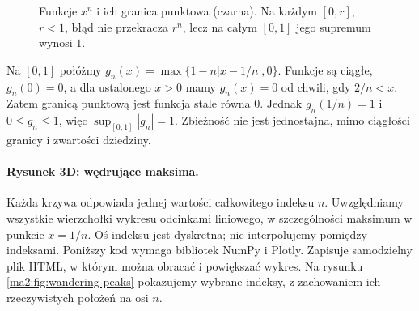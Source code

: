 \begin{figure}[htbp]
\centering
{}
\caption{Funkcje $x^n$ i ich granica punktowa (czarna).
Na każdym $[0,r]$, $r<1$, błąd nie przekracza $r^n$,
lecz na całym $[0,1]$ jego supremum wynosi $1$.}
\label{ma2:fig:powers-uniform}
\end{figure}
\FloatBarrier

\begin{przyklad}
\label{ma2:ex:moving-peak}
Na $[0,1]$ połóżmy
$g_n(x)=\max\{1-n|x-1/n|,0\}$.
Funkcje są ciągłe, $g_n(0)=0$, a dla ustalonego
$x>0$ mamy $g_n(x)=0$ od chwili, gdy $2/n<x$.
Zatem granicą punktową jest funkcja stale równa $0$.
Jednak $g_n(1/n)=1$ i $0\le g_n\le1$, więc
$\sup_{[0,1]}|g_n|=1$. Zbieżność nie jest jednostajna,
mimo ciągłości granicy i zwartości dziedziny.
\end{przyklad}

\paragraph{Rysunek 3D: wędrujące maksima.}
Każda krzywa odpowiada jednej wartości całkowitego indeksu $n$.
Uwzględniamy wszystkie wierzchołki wykresu odcinkami liniowego,
w szczególności maksimum w punkcie $x=1/n$.
Oś indeksu jest dyskretna; nie interpolujemy pomiędzy indeksami.
Poniższy kod wymaga bibliotek NumPy i Plotly. Zapisuje samodzielny
plik HTML, w którym można obracać i powiększać wykres.
Na rysunku \ref{ma2:fig:wandering-peaks} pokazujemy wybrane
indeksy, z zachowaniem ich rzeczywistych położeń na osi $n$.

